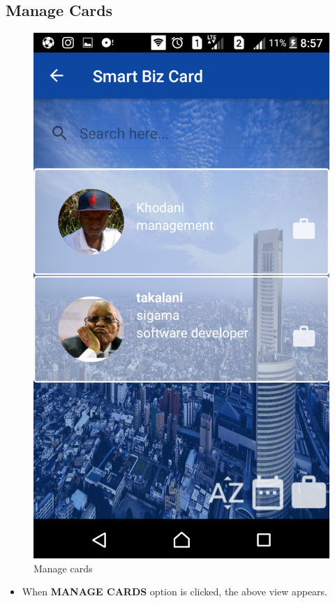 \documentclass[english]{article}
\begin{document}
\subsection{Manage Cards}
		\begin{figure}[H]
			\centering
			\includegraphics[scale=0.3]{Manage_Card.png}
			\caption{Manage cards}
			\label{figure: 6}
		\end{figure}
		\begin{itemize}
			\item When \textbf{MANAGE CARDS} option is clicked, the above view appears. 
		\end{itemize}
		
\end{document}
